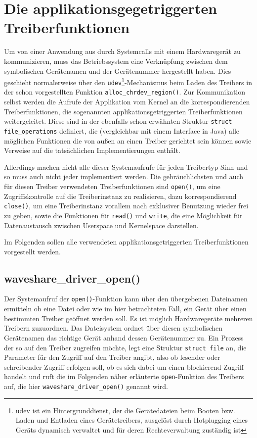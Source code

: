 \section{Die applikationsgegetriggerten Treiberfunktionen}
Um von einer Anwendung aus durch Systemcalls mit einem Hardwaregerät zu kommunizieren, muss das Betriebssystem eine Verknüpfung zwischen dem symbolischen Gerätenamen und der Gerätenummer hergestellt haben. Dies geschieht normalerweise über den \texttt{udev}\footnote{udev ist ein Hintergrunddienst, der die Gerätedateien beim Booten bzw. Laden und Entladen eines Gerätetreibers, ausgelöst durch Hotplugging eines Geräts dynamisch verwaltet und für deren Rechteverwaltung zuständig ist}-Mechanismus beim Laden des Treibers in der schon vorgestellten Funktion \texttt{alloc_chrdev_region()}. Zur Kommunikation selbst werden die Aufrufe der Applikation vom Kernel an die korrespondierenden Treiberfunktionen, die sogenannten applikationsgetriggerten Treiberfunktionen weitergeleitet. Diese sind in der ebenfalls schon erwähnten Struktur \texttt{struct file_operations} definiert, die (vergleichbar mit einem Interface in Java) alle möglichen Funktionen die von außen an einen Treiber gerichtet sein können sowie Verweise auf die tatsächlichen Implementierungen enthält. 

Allerdings machen nicht alle dieser Systemaufrufe für jeden Treibertyp Sinn und so muss auch nicht jeder implementiert werden. Die gebräuchlichsten und auch für diesen Treiber verwendeten Treiberfunktionen sind \texttt{open()}, um eine Zugriffskontrolle auf die Treiberinstanz zu realisieren, dazu korrespondierend \texttt{close()}, um eine Treiberinstanz vorallem nach exklusiver Benutzung wieder frei zu geben, sowie die Funktionen für \texttt{read()} und \texttt{write}, die eine Möglichkeit für Datenaustausch zwischen Userspace und Kernelspace darstellen. 

Im Folgenden sollen alle verwendeten applikationsgetriggerten Treiberfunktionen vorgestellt werden.


\subsection{waveshare\_driver\_open()}
Der Systemaufruf der \texttt{open()}-Funktion kann über den übergebenen Dateinamen ermitteln ob eine Datei oder wie im hier betrachteten Fall, ein Gerät über einen bestimmten Treiber geöffnet werden soll. Es ist möglich Hardwaregeräte mehreren Treibern zuzuordnen. Das Dateisystem ordnet über diesen symbolischen Gerätenamen das richtige Gerät anhand dessen Gerätenummer zu. %
Ein Prozess der so auf den Treiber zugreifen möchte, legt eine Struktur \texttt{struct file} an, die Parameter für den Zugriff auf den Treiber angibt, also ob lesender oder schreibender Zugriff erfolgen soll, ob es sich dabei um einen blockierend Zugriff handelt und ruft die im Folgenden näher erläuterte \texttt{open}-Funktion des Treibers auf, die hier \texttt{waveshare_driver_open()} genannt wird. \newline


